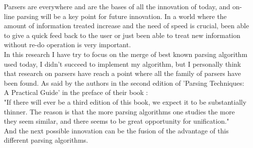Parsers are everywhere and are the bases of all the innovation of today, and on-line parsing will be a key point for future innovation. In a world where the amount of information treated increase and the need of speed is crucial, been able to give a quick feed back to the user or just been able to treat new information without re-do operation is very important.\\
In this research I have try to focus on the merge of best known parsing algorithm used today, I didn't succeed to implement my algorithm, but I personally think that research on parsers have reach a point where all the family of parsers have been found. As said by the authors in the second edition of 'Parsing Techniques: A Practical Guide' in the preface of their book :
\\
"If there will ever be a third edition of this book, we expect it to be substantially thinner. The reason is that the more parsing algorithms one studies the more they seem similar, and there seems to be great opportunity for unification."\cite{grune2008parsing}
\\
And the next possible innovation can be the fusion of the advantage of this different parsing algorithms.